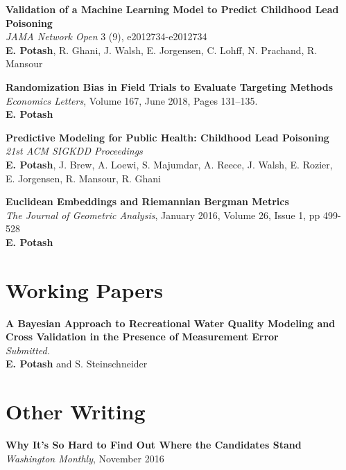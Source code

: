 \documentclass[margin,line]{resume}
\begin{document}
\begin{resume}
        {\bf Validation of a Machine Learning Model to Predict Childhood Lead \\ Poisoning}\\
        \textit{JAMA Network Open} 3 (9), e2012734-e2012734\\
        \textbf{E. Potash}, R. Ghani, J. Walsh, E. Jorgensen, C. Lohff, N. Prachand, R. Mansour

        {\bf Randomization Bias in Field Trials to Evaluate Targeting Methods}\\
        \textit{Economics Letters}, Volume 167, June 2018, Pages 131--135.\\
        \textbf{E. Potash}

	{\bf Predictive Modeling for Public Health: Childhood Lead Poisoning} \\
        \textit{21st ACM SIGKDD Proceedings} \\
        \textbf{E. Potash}, J. Brew, A. Loewi, S. Majumdar, A. Reece, J. Walsh, E. Rozier,\\ E. Jorgensen, R. Mansour, R. Ghani

	{\bf Euclidean Embeddings and Riemannian Bergman Metrics} \\
        \textit{The Journal of Geometric Analysis}, January 2016, Volume 26, Issue 1, pp 499-528\\
        \textbf{E. Potash}

        \section{\mysidestyle Working Papers}
        
        {\bf A Bayesian Approach to Recreational Water Quality Modeling and \\ Cross Validation in the Presence of Measurement Error}\\
        \textit{Submitted.}\\
        \textbf{E. Potash} and S. Steinschneider

        \section{\mysidestyle Other Writing}
        {\bf Why It's So Hard to Find Out Where the Candidates Stand} \\
        \textit{Washington Monthly}, November 2016


\end{resume}
\end{document}

